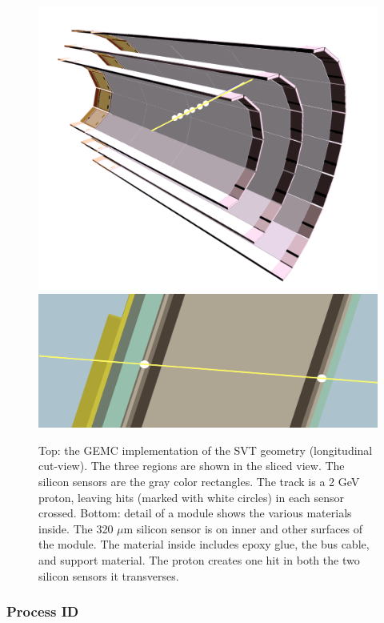 \begin{figure}
	\centering
	\includegraphics[width=0.99\columnwidth,keepaspectratio]{img/bstGeometry.png}
	\includegraphics[width=0.99\columnwidth,keepaspectratio]{img/bstDetail.png}
	\caption{Top: the GEMC implementation of the SVT geometry (longitudinal cut-view).
	         The three regions are shown in the sliced view. The silicon sensors are
             the gray color rectangles. The track is a 2 GeV proton, leaving hits (marked with white circles)
			 in each sensor crossed. Bottom: detail of a module shows
             the various materials inside. The 320 $\mu$m silicon sensor is on inner and other surfaces of the module.
             The material inside includes epoxy glue, the bus cable, and support material. The proton creates one hit
		     in both the two silicon sensors it transverses.}
	\label{fig:bstGeometry}
\end{figure}


\subsubsection{Process ID}

